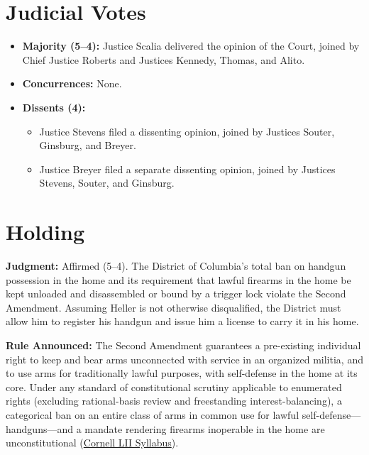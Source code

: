 \documentclass[12pt]{article}
\begin{document}
\section{Judicial Votes}
\begin{itemize}
  \item \textbf{Majority (5--4):} Justice Scalia delivered the opinion of the Court, joined by Chief Justice Roberts and Justices Kennedy, Thomas, and Alito.
  \item \textbf{Concurrences:} None.
  \item \textbf{Dissents (4):}
    \begin{itemize}
      \item Justice Stevens filed a dissenting opinion, joined by Justices Souter, Ginsburg, and Breyer.
      \item Justice Breyer filed a separate dissenting opinion, joined by Justices Stevens, Souter, and Ginsburg.
    \end{itemize}
\end{itemize}

\section{Holding}
\textbf{Judgment:} Affirmed (5--4). The District of Columbia's total ban on handgun possession in the home and its requirement that lawful firearms in the home be kept unloaded and disassembled or bound by a trigger lock violate the Second Amendment. Assuming Heller is not otherwise disqualified, the District must allow him to register his handgun and issue him a license to carry it in his home.

\textbf{Rule Announced:} The Second Amendment guarantees a pre-existing individual right to keep and bear arms unconnected with service in an organized militia, and to use arms for traditionally lawful purposes, with self-defense in the home at its core. Under any standard of constitutional scrutiny applicable to enumerated rights (excluding rational-basis review and freestanding interest-balancing), a categorical ban on an entire class of arms in common use for lawful self-defense---handguns---and a mandate rendering firearms inoperable in the home are unconstitutional (\href{https://www.law.cornell.edu/supct/html/07-290.ZS.html}{Cornell LII Syllabus}).
\end{document}
